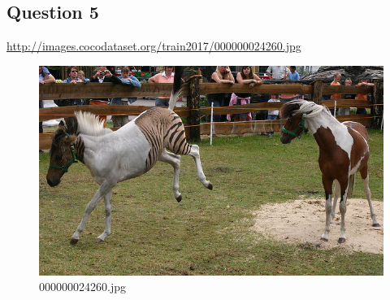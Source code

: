 \subsection*{Question 5}
\url{http://images.cocodataset.org/train2017/000000024260.jpg}
    \begin{figure}[h]
        \centering
        \includegraphics[width=0.8\linewidth]{../image set/easy/000000024260.jpg}
        \caption{000000024260.jpg}
    \end{figure}

